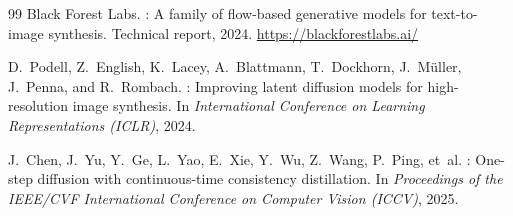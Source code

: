 \documentclass[11pt]{article}
\begin{document}
\begin{thebibliography}{99}
Black Forest Labs.
: A family of flow-based generative models for text-to-image
  synthesis.
\newblock Technical report, 2024.
\newblock \url{https://blackforestlabs.ai/}

D.~Podell, Z.~English, K.~Lacey, A.~Blattmann, T.~Dockhorn, J.~M\"{u}ller,
  J.~Penna, and R.~Rombach.
: Improving latent diffusion models for high-resolution image
  synthesis.
\newblock In \emph{International Conference on Learning Representations
  (ICLR)}, 2024.

J.~Chen, J.~Yu, Y.~Ge, L.~Yao, E.~Xie, Y.~Wu, Z.~Wang, P.~Ping, et~al.
: One-step diffusion with continuous-time consistency
  distillation.
\newblock In \emph{Proceedings of the IEEE/CVF International Conference on
  Computer Vision (ICCV)}, 2025.

\end{thebibliography}
\end{document}
